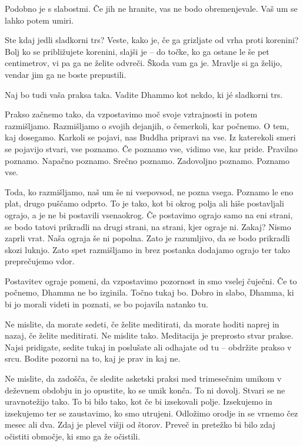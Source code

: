 Podobno je s slabostmi. Če jih ne hranite, vas ne bodo obremenjevale. Vaš um se lahko potem umiri.


Ste kdaj jedli sladkorni trs? Veste, kako je, če ga grizljate od vrha proti korenini? Bolj ko se približujete korenini, slajši je – do točke, ko ga ostane le še pet centimetrov, vi pa ga ne želite odvreči. Škoda vam ga je. Mravlje si ga želijo, vendar jim ga ne boste prepustili.

Naj bo tudi vaša praksa taka. Vadite Dhammo kot nekdo, ki jé sladkorni trs.

\clearpage


Prakso začnemo tako, da vzpostavimo moč svoje vztrajnosti in potem razmišljamo. Razmišljamo o svojih dejanjih, o čemerkoli, kar počnemo. O tem, kaj dosegamo. Karkoli se pojavi, nas Buddha pripravi na vse. Iz katerekoli smeri se pojavijo stvari, vse poznamo. Če poznamo vse, vidimo vse, kar pride. Pravilno poznamo. Napačno poznamo. Srečno poznamo. Zadovoljno poznamo. Poznamo vse.

Toda, ko razmišljamo, naš um še ni vsepovsod, ne pozna vsega. Poznamo le eno plat, drugo puščamo odprto. To je tako, kot bi okrog polja ali hiše postavljali ograjo, a je ne bi postavili vsenaokrog. Če postavimo ograjo samo na eni strani, se bodo tatovi prikradli na drugi strani, na strani, kjer ograje ni. Zakaj? Nismo zaprli vrat. Naša ograja še ni popolna. Zato je razumljivo, da se bodo prikradli skozi luknjo. Zato spet razmišljamo in brez postanka dodajamo ograjo ter tako preprečujemo vdor.

Postavitev ograje pomeni, da vzpostavimo pozornost in smo vselej čuječni. Če to počnemo, Dhamma ne bo izginila. Točno tukaj bo. Dobro in slabo, Dhamma, ki bi jo morali videti in poznati, se bo pojavila natanko tu.

\clearpage


Ne mislite, da morate sedeti, če želite meditirati, da morate hoditi naprej in nazaj, če želite meditirati. Ne mislite tako. Meditacija je preprosto stvar prakse. Najsi pridigate, sedite tukaj in poslušate ali odhajate od tu – obdržite prakso v srcu. Bodite pozorni na to, kaj je prav in kaj ne.

Ne mislite, da zadošča, če sledite asketski praksi med trimesečnim umikom v deževnem obdobju in jo opustite, ko se umik konča. To ni dovolj. Stvari se ne uravnotežijo tako. To bi bilo tako, kot če bi izsekovali polje. Izsekujemo in izsekujemo ter se zaustavimo, ko smo utrujeni. Odložimo orodje in se vrnemo čez mesec ali dva. Zdaj je plevel višji od štorov. Preveč in pretežko bi bilo zdaj očistiti območje, ki smo ga že očistili.

